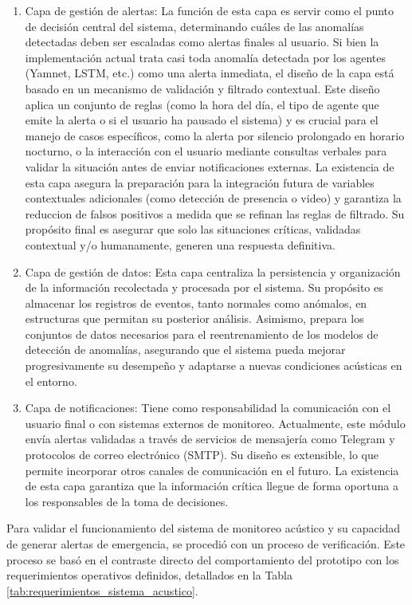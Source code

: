 \begin{enumerate}
      \item Capa de gestión de alertas: La función de esta capa es servir como el punto de decisión central del sistema, determinando cuáles de las anomalías detectadas deben ser escaladas como alertas finales al usuario. Si bien la implementación actual trata casi toda anomalía detectada por los agentes (Yamnet, LSTM, etc.) como una alerta inmediata, el diseño de la capa está basado en un mecanismo de validación y filtrado contextual. Este diseño aplica un conjunto de reglas (como la hora del día, el tipo de agente que emite la alerta o si el usuario ha pausado el sistema) y es crucial para el manejo de casos específicos, como la alerta por silencio prolongado en horario nocturno, o la interacción con el usuario mediante consultas verbales para validar la situación antes de enviar notificaciones externas. La existencia de esta capa asegura la preparación para la integración futura de variables contextuales adicionales (como detección de presencia o video) y garantiza la reduccion de falsos positivos a medida que se refinan las reglas de filtrado. Su propósito final es asegurar que solo las situaciones críticas, validadas contextual y/o humanamente, generen una respuesta definitiva.
      \item Capa de gestión de datos: Esta capa centraliza la persistencia y organización de la información recolectada y procesada por el sistema. Su propósito es almacenar los registros de eventos, tanto normales como anómalos, en estructuras que permitan su posterior análisis. Asimismo, prepara los conjuntos de datos necesarios para el reentrenamiento de los modelos de detección de anomalías, asegurando que el sistema pueda mejorar progresivamente su desempeño y adaptarse a nuevas condiciones acústicas en el entorno.
      \item Capa de notificaciones: Tiene como responsabilidad la comunicación con el usuario final o con sistemas externos de monitoreo. Actualmente, este módulo envía alertas validadas a través de servicios de mensajería como Telegram y protocolos de correo electrónico (SMTP). Su diseño es extensible, lo que permite incorporar otros canales de comunicación en el futuro. La existencia de esta capa garantiza que la información crítica llegue de forma oportuna a los responsables de la toma de decisiones.
\end{enumerate}


Para validar el funcionamiento del sistema de monitoreo acústico y su capacidad de generar alertas de emergencia, se procedió con un proceso de verificación. Este proceso se basó en el contraste directo del comportamiento del prototipo con los requerimientos operativos definidos, detallados en la Tabla \ref{tab:requerimientos_sistema_acustico}.

